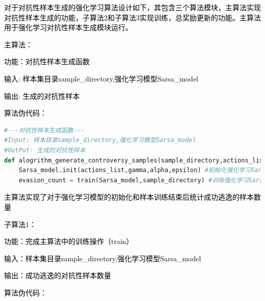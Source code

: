 \textcolor{black}{对于对抗性样本生成的强化学习算法设计如下，其包含三个算法模块，主算法实现对抗性样本生成的功能，子算法2和子算法3实现训练，总奖励更新的功能。主算法用于强化学习对抗性样本生成模块运行。}

\textcolor{black}{主算法：}

\textcolor{black}{功能：对抗性样本生成函数}

\textcolor{black}{输入: 样本集目录sample\_directory,强化学习模型Sarsa\_model }

\textcolor{black}{输出: 生成的对抗性样本}

\textcolor{black}{算法伪代码：}

\begin{lstlisting}[language=Python, caption={code for main alogrithm}, label={lst:pythonfile1}]
#---对抗性样本生成函数---
#Input: 样本目录sample_directory,强化学习模型Sarsa_model 
#OutPut: 生成的对抗性样本
def alogrithm_generate_controversy_samples(sample_directory,actions_list,Sarsa_model):
    Sarsa_model.init(actions_list,gamma,alpha,epsilon) #初始化强化学习Sarsa模型，传入待训练的样本集路径，行为集，学习率，探索率，折扣因子
    evasion_count = train(Sarsa_model,sample_directory) #训练强化学习Sarsa模型
\end{lstlisting}

\textcolor{black}{主算法实现了对于强化学习模型的初始化和样本训练结束后统计成功逃逸的样本数量}

\textcolor{black}{子算法1：}

\textcolor{black}{功能：完成主算法中的训练操作（train）}

\textcolor{black}{输入：样本集目录sample\_directory,强化学习模型Sarsa\_model}

\textcolor{black}{输出：成功逃逸的对抗性样本数量}

\textcolor{black}{算法伪代码：}

